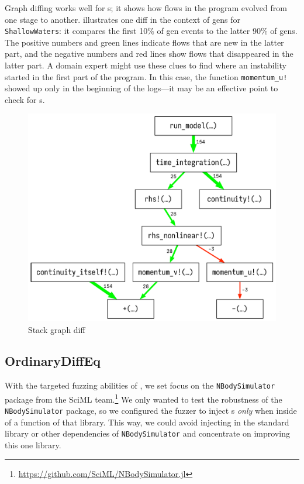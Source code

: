 \documentclass{juliacon}
\begin{document}
Graph diffing works well for \CSTG{}s; it shows how flows in the program evolved
from one stage to another.
 illustrates one diff in the context of \NaN{} gens for
\texttt{ShallowWaters}:
it compares the first 10\% of gen events to the latter 90\% of gens.
The positive numbers and green lines indicate flows that are new in the latter part,
and the negative numbers and red lines show flows that disappeared in the latter part.
A domain expert might use these clues to find where an instability started in
the first part of the program.
In this case, the function \texttt{momentum\_u!} showed up only in the
beginning of the logs---it may be an effective point to check for \Nan{}s.

\begin{figure}[t]
  \centering
  \includegraphics[width=0.96\columnwidth]{./fig/cstg_diff_pretty.pdf}
  \caption{Stack graph diff}
  \label{fig:cstg_diff_demo}
\end{figure}


\subsection{OrdinaryDiffEq}
\label{s:ode}

With the targeted fuzzing abilities of \FT{}, we set focus on the
\texttt{NBodySimulator} package from the SciML
team.\footnote{\url{https://github.com/SciML/NBodySimulator.jl}}
We only wanted to test the robustness of the \texttt{NBodySimulator} package, so we configured the fuzzer to inject \NaN{}s \emph{only} when inside of a function of that library.
This way, we could avoid injecting in the standard library or other dependencies of \texttt{NBodySimulator} and concentrate on improving this one library.
\end{document}

